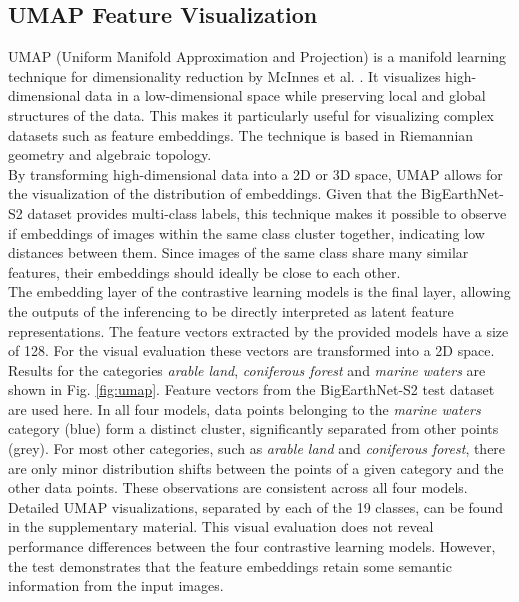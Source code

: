 \subsection{UMAP Feature Visualization}
UMAP (Uniform Manifold Approximation and Projection) is a manifold learning technique for dimensionality reduction by McInnes et al. \cite{umap}. It visualizes high-dimensional data in a low-dimensional space while preserving local and global structures of the data. This makes it particularly useful for visualizing complex datasets such as feature embeddings. The technique is based in Riemannian geometry and algebraic topology. \\
By transforming high-dimensional data into a 2D or 3D space, UMAP allows for the visualization of the distribution of embeddings. Given that the BigEarthNet-S2 dataset provides multi-class labels, this technique makes it possible to observe if embeddings of images within the same class cluster together, indicating low distances between them. Since images of the same class share many similar features, their embeddings should ideally be close to each other. \\
The embedding layer of the contrastive learning models is the final layer, allowing the outputs of the inferencing to be directly interpreted as latent feature representations. The feature vectors extracted by the provided models have a size of 128. For the visual evaluation these vectors are transformed into a 2D space. \\
Results for the categories \textit{arable land}, \textit{coniferous forest} and \textit{marine waters} are shown in Fig. \ref{fig:umap}. Feature vectors from the BigEarthNet-S2 test dataset are used here. In all four models, data points belonging to the \textit{marine waters} category (blue) form a distinct cluster, significantly separated from other points (grey). For most other categories, such as \textit{arable land} and \textit{coniferous forest}, there are only minor distribution shifts between the points of a given category and the other data points. These observations are consistent across all four models. Detailed UMAP visualizations, separated by each of the 19 classes, can be found in the supplementary material. This visual evaluation does not reveal performance differences between the four contrastive learning models. However, the test demonstrates that the feature embeddings retain some semantic information from the input images.

